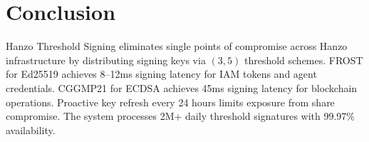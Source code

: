 \section{Conclusion}

\label{sec:conclusion}

Hanzo Threshold Signing eliminates single points of compromise across Hanzo
infrastructure by distributing signing keys via $(3, 5)$ threshold schemes.
FROST for Ed25519 achieves 8--12ms signing latency for IAM tokens and agent
credentials. CGGMP21 for ECDSA achieves 45ms signing latency for blockchain
operations. Proactive key refresh every 24 hours limits exposure from share
compromise. The system processes 2M+ daily threshold signatures with 99.97\%
availability.

